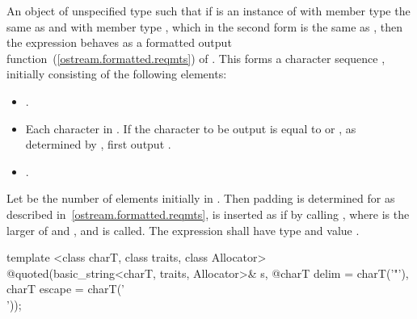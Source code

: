 \begin{itemdescr}
\pnum
\returns An object of unspecified type such that if  is an instance
of  with member type  the same as
 and with member type , which in the second
form is the same as , then the expression
behaves as a formatted output function~(\ref{ostream.formatted.reqmts})
of . This forms a character sequence , initially
consisting of the following elements:
\begin{itemize}
\item {}.
\item Each character in . If the character to be output is equal to
 or , as determined by , first
output .
\item {}.
\end{itemize}
Let  be the number of elements initially in .
Then padding is determined for  as described
in~\ref{ostream.formatted.reqmts},  is inserted as if by calling
, where  is the larger of
 and , and  is called.
The expression  shall have type
 and value .
\end{itemdescr}

%
\begin{itemdecl}
template <class charT, class traits, class Allocator>
  @\unspec@ quoted(basic_string<charT, traits, Allocator>& s,
  @\itcorr@                   charT delim = charT('"'), charT escape = charT('\\'));
\end{itemdecl}

